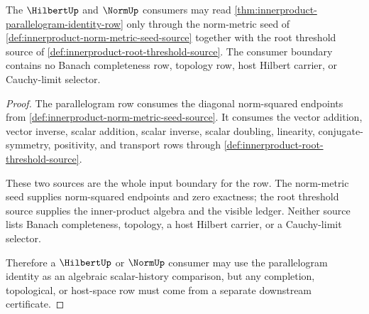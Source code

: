 \begin{theorem}
\label{thm:innerproduct-norm-seed-hilbert-consumer-boundary}
The $\HilbertUp$ and $\NormUp$ consumers may read
\autoref{thm:innerproduct-parallelogram-identity-row} only through the
norm-metric seed of \autoref{def:innerproduct-norm-metric-seed-source}
together with the root threshold source of
\autoref{def:innerproduct-root-threshold-source}. The consumer boundary
contains no Banach completeness row, topology row, host Hilbert carrier, or
Cauchy-limit selector.
\end{theorem}
\begin{proof}
The parallelogram row consumes the diagonal norm-squared endpoints from
\autoref{def:innerproduct-norm-metric-seed-source}. It consumes the vector
addition, vector inverse, scalar addition, scalar inverse, scalar doubling,
linearity, conjugate-symmetry, positivity, and transport rows through
\autoref{def:innerproduct-root-threshold-source}.

These two sources are the whole input boundary for the row. The norm-metric
seed supplies norm-squared endpoints and zero exactness; the root threshold
source supplies the inner-product algebra and the visible ledger. Neither
source lists Banach completeness, topology, a host Hilbert carrier, or a
Cauchy-limit selector.

Therefore a $\HilbertUp$ or $\NormUp$ consumer may use the parallelogram
identity as an algebraic scalar-history comparison, but any completion,
topological, or host-space row must come from a separate downstream
certificate.
\end{proof}

